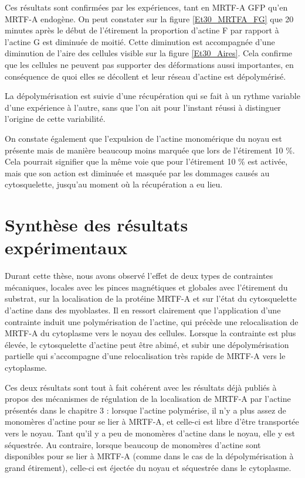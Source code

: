 Ces résultats sont confirmées par les expériences, tant en MRTF-A GFP qu'en MRTF-A endogène. On peut constater sur la figure \ref{Et30_MRTFA_FG} que 20 minutes après le début de l'étirement la proportion d'actine F par rapport à l'actine G est diminuée de moitié. Cette diminution est accompagnée d'une diminution de l'aire des cellules visible sur la figure \ref{Et30_Aires}. Cela confirme que les cellules ne peuvent pas supporter des déformations aussi importantes, en conséquence de quoi elles se décollent et leur réseau d'actine est dépolymérisé. 

La dépolymérisation est suivie d'une récupération qui se fait à un rythme variable d'une expérience à l'autre, sans que l'on ait pour l'instant réussi à distinguer l'origine de cette variabilité. 

On constate également que l'expulsion de l'actine monomérique du noyau est présente mais de manière beaucoup moins marquée que lors de l'étirement 10 \%. Cela pourrait signifier que la même voie que pour l'étirement 10 \% est activée, mais que son action est diminuée et masquée par les dommages causés au cytosquelette, jusqu'au moment où la récupération a eu lieu. 


\section{Synthèse des résultats expérimentaux}

Durant cette thèse, nous avons observé l'effet de deux types de contraintes mécaniques, locales avec les pinces magnétiques et globales avec l'étirement du substrat, sur la localisation de la protéine MRTF-A et sur l'état du cytosquelette d'actine dans des myoblastes. 
Il en ressort clairement que l'application d'une contrainte induit une polymérisation de l'actine, qui précède une relocalisation de MRTF-A du cytoplasme vers le noyau des cellules. Lorsque la contrainte est plus élevée, le cytosquelette d'actine peut être abimé, et subir une dépolymérisation partielle qui s'accompagne d'une relocalisation très rapide de MRTF-A vers le cytoplasme. 

Ces deux résultats sont tout à fait cohérent avec les résultats déjà publiés à propos des mécanismes de régulation de la localisation de MRTF-A par l'actine présentés dans le chapitre 3 : lorsque l'actine polymérise, il n'y a plus assez de monomères d'actine pour se lier à MRTF-A, et celle-ci est libre d'être transportée vers le noyau. Tant qu'il y a peu de monomères d'actine dans le noyau, elle y est séquestrée. Au contraire, lorsque beaucoup de monomères d'actine sont disponibles pour se lier à MRTF-A (comme dans le cas de la dépolymérisation à grand étirement), celle-ci est éjectée du noyau et séquestrée dans le cytoplasme. 

